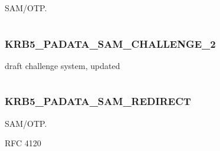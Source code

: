 \documentclass[letterpaper,10pt,english]{sphinxmanual}
\begin{document}
SAM/OTP.

\begin{tabulary}{\linewidth}{|L|L|}
\hline

 & 
\\\hline
\end{tabulary}



\subsubsection{KRB5\_PADATA\_SAM\_CHALLENGE\_2}
\label{appdev/refs/macros/KRB5_PADATA_SAM_CHALLENGE_2:krb5-padata-sam-challenge-2-data}\label{appdev/refs/macros/KRB5_PADATA_SAM_CHALLENGE_2:krb5-padata-sam-challenge-2}\label{appdev/refs/macros/KRB5_PADATA_SAM_CHALLENGE_2::doc}

\begin{fulllineitems}
\label{appdev/refs/macros/KRB5_PADATA_SAM_CHALLENGE_2:KRB5_PADATA_SAM_CHALLENGE_2}
\end{fulllineitems}


draft challenge system, updated

\begin{tabulary}{\linewidth}{|L|L|}
\hline

 & 
\\\hline
\end{tabulary}



\subsubsection{KRB5\_PADATA\_SAM\_REDIRECT}
\label{appdev/refs/macros/KRB5_PADATA_SAM_REDIRECT::doc}\label{appdev/refs/macros/KRB5_PADATA_SAM_REDIRECT:krb5-padata-sam-redirect-data}\label{appdev/refs/macros/KRB5_PADATA_SAM_REDIRECT:krb5-padata-sam-redirect}

\begin{fulllineitems}
\label{appdev/refs/macros/KRB5_PADATA_SAM_REDIRECT:KRB5_PADATA_SAM_REDIRECT}
\end{fulllineitems}


SAM/OTP.

RFC 4120
\end{document}
